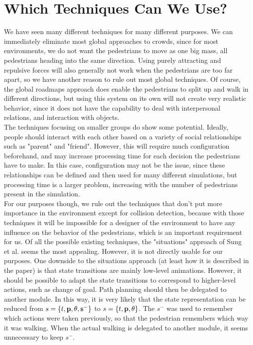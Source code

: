 \documentclass[11pt, a4paper]{book}
\begin{document}
\section{Which Techniques Can We Use?}
We have seen many different techniques for many different purposes. We can immediately eliminate most global approaches to  crowds, since for most environments, we do not want the pedestrians to move as one big mass, all pedestrians heading into the same direction. Using purely attracting and repulsive forces will also generally not work when the pedestrians are too far apart, so we have another reason to rule out most global techniques. Of course, the global roadmaps approach does enable the pedestrians to split up and walk in different directions, but using this system on its own will not create very realistic behavior, since it does not have the capability to deal with interpersonal relations, and interaction with objects.\\
The techniques focusing on smaller groups do show some potential. Ideally, people should interact with each other based on a variety of social relationships such as "parent" and "friend". However, this will require much configuration beforehand, and may increase processing time for each decision the pedestrians have to make. In this case, configuration may not be the issue, since these relationships can be defined and then used for many different simulations, but processing time is a larger problem, increasing with the number of pedestrians present in the simulation.\\
For our purposes though, we rule out the techniques that don't put more importance in the environment except for collision detection, because with those techniques it will be impossible for a designer of the environment to have any influence on the behavior of the pedestrians, which is an important requirement for us.
Of all the possible existing techniques, the "situations" approach of Sung et al. seems the most appealing. 
However, it is not directly usable for our purposes. One downside to the situations approach (at least how it is described in the paper) is that state transitions are mainly low-level animations. However, it should be possible to adapt the state transitions to correspond to higher-level actions, such as change of goal. Path planning should then be delegated to another module. In this way, it is very likely that the state representation can be reduced from $s = \{t, \bf{p}, \theta, s^- \}$ to $s = \{t, \bf{p}, \theta\}$. The $s^-$ was used to remember which actions were taken previously, so that the pedestrian remembers which way it was walking. When the actual walking is delegated to another module, it seems unnecessary to keep $s^-$.
\end{document}
